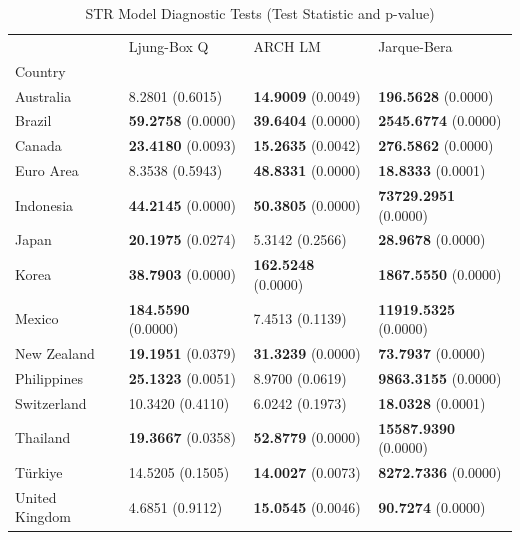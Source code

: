\documentclass[a4paper,10pt,final]{article}    %
\begin{document}
\begin{table}[htbp]
    \caption{STR Model Diagnostic Tests (Test Statistic and p-value)}
    \label{tab:str_diagnostics}
    \begin{tabular}{llll}
        \toprule
                       & Ljung-Box Q                & ARCH LM                    & Jarque-Bera                  \\
        Country        &                            &                            &                              \\
        \midrule
        Australia      & 8.2801 (0.6015)            & \textbf{14.9009} (0.0049)  & \textbf{196.5628} (0.0000)   \\
        Brazil         & \textbf{59.2758} (0.0000)  & \textbf{39.6404} (0.0000)  & \textbf{2545.6774} (0.0000)  \\
        Canada         & \textbf{23.4180} (0.0093)  & \textbf{15.2635} (0.0042)  & \textbf{276.5862} (0.0000)   \\
        Euro Area      & 8.3538 (0.5943)            & \textbf{48.8331} (0.0000)  & \textbf{18.8333} (0.0001)    \\
        Indonesia      & \textbf{44.2145} (0.0000)  & \textbf{50.3805} (0.0000)  & \textbf{73729.2951} (0.0000) \\
        Japan          & \textbf{20.1975} (0.0274)  & 5.3142 (0.2566)            & \textbf{28.9678} (0.0000)    \\
        Korea          & \textbf{38.7903} (0.0000)  & \textbf{162.5248} (0.0000) & \textbf{1867.5550} (0.0000)  \\
        Mexico         & \textbf{184.5590} (0.0000) & 7.4513 (0.1139)            & \textbf{11919.5325} (0.0000) \\
        New Zealand    & \textbf{19.1951} (0.0379)  & \textbf{31.3239} (0.0000)  & \textbf{73.7937} (0.0000)    \\
        Philippines    & \textbf{25.1323} (0.0051)  & 8.9700 (0.0619)            & \textbf{9863.3155} (0.0000)  \\
        Switzerland    & 10.3420 (0.4110)           & 6.0242 (0.1973)            & \textbf{18.0328} (0.0001)    \\
        Thailand       & \textbf{19.3667} (0.0358)  & \textbf{52.8779} (0.0000)  & \textbf{15587.9390} (0.0000) \\
        Türkiye        & 14.5205 (0.1505)           & \textbf{14.0027} (0.0073)  & \textbf{8272.7336} (0.0000)  \\
        United Kingdom & 4.6851 (0.9112)            & \textbf{15.0545} (0.0046)  & \textbf{90.7274} (0.0000)    \\
        \bottomrule
    \end{tabular}
\end{table}
\end{document}
